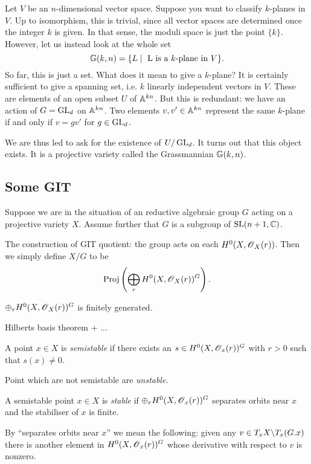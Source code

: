 \documentclass[11pt, english]{article}
\begin{document}
Let $V$ be an $n$-dimensional vector space. Suppose you want to classify $k$-planes in $V$. Up to isomorphism, this is trivial, since all vector spaces are determined once the integer $k$ is given. In that sense, the moduli space is just the point $\{k \}$. However, let us instead look at the whole set
$$ \mathbb{G}(k,n) = \{ L \mid \text{ L is a $k$-plane in $V$} \}.$$
So far, this is just a set. What does it mean to give a $k$-plane? It is certainly sufficient to give a spanning set, i.e. $k$ linearly independent vectors in $V$. These are elements of an open subset $U$ of $\mathbb{A}^{kn}$. But this is redundant: we have an action of $G=\operatorname{GL}_d$ on $\mathbb{A}^{kn}$. Two elements $v,v' \in \mathbb{A}^{kn}$  represent the same $k$-plane if and only if $v =gv'$ for $g \in \operatorname{GL}_d$.

We are thus led to ask for the existence of $U/\operatorname{GL}_d$. It turns out that this object exists. It is a projective variety called the Grassmannian $\mathbb{G}(k,n)$.

\subsection{Some GIT}

\cite{thomas_git}

Suppose we are in the situation of an reductive algebraic group $G$  acting on a projective variety $X$. Assume further that $G$ is a subgroup of $\operatorname{SL}(n+1,\mathbb{C})$.

The construction of GIT quotient: the group acts on each $H^0(X,\operatorname{\mathscr{O}}_X(r))$. Then we simply define $X/G$ to be 
$$
\operatorname{Proj}\left(\bigoplus_r H^0(X,\operatorname{\mathscr{O}}_X(r))^G\right).
$$
\begin{lemma}
$\oplus_r H^0(X,\operatorname{\mathscr{O}}_X(r))^G$ is finitely generated.
\end{lemma}
\begin{lemma}
  Hilberts basis theorem + ...
\end{lemma}

\begin{defi}
A point $x \in X$ is \emph{semistable} if there exists an $s \in H^0(X,\operatorname{\mathscr{O}}_x(r))^G$ with $r > 0$ such that $s(x) \neq 0$.
\end{defi}
Point which are not semistable are \emph{unstable}. 

\begin{defi}
A semistable point $x  \in X$ is \emph{stable} if $\oplus_r H^0(X,\operatorname{\mathscr{O}}_x(r))^G$ separates orbits near $x$ and the stabiliser of $x$ is finite.
\end{defi}
By ``separates orbits near $x$'' we mean the following: given any $v \in T_xX \backslash T_x(G.x)$ there is another element in $H^0(X,\operatorname{\mathscr{O}}_x(r))^G$ whose derivative with respect to $v$ is nonzero.


 
\end{document}

